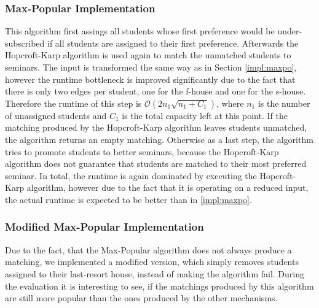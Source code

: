 \subsubsection{Max-Popular Implementation}
This algorithm first assings all students whose first preference would be under-subscribed if all students are assigned to their first preference. Afterwards the Hopcroft-Karp algorithm is used again to match the unmatched students to seminars. The input is transformed the same way as in Section \ref{impl:maxpo}, however the runtime bottleneck is improved significantly due to the fact that there is only two edges per student, one for the f-house and one for the s-house. Therefore the runtime of this step is $\mathcal{O}(2n_1\sqrt{n_1+C_1})$, where $n_1$ is the number of unassigned students and $C_1$ is the total capacity left at this point. If the matching produced by the Hopcroft-Karp algorithm leaves students unmatched, the algorithm returns an empty matching. Otherwise as a last step, the algorithm tries to promote students to better seminars, because the Hopcroft-Karp algorithm does not guarantee that students are matched to their most preferred seminar. In total, the runtime is again dominated by executing the Hopcroft-Karp algorithm, however due to the fact that it is operating on a reduced input, the actual runtime is expected to be better than in \ref{impl:maxpo}.

\subsubsection{Modified Max-Popular Implementation}\label{impl:mod-max-pop}
Due to the fact, that the Max-Popular algorithm does not always produce a matching, we implemented a modified version, which simply removes students assigned to their last-resort house, instead of making the algorithm fail. During the evaluation it is interesting to see, if the matchings produced by this algorithm are still more popular than the ones produced by the other mechanisms.


